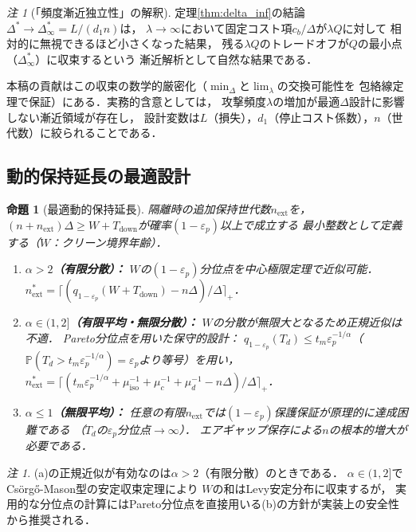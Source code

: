 \documentclass[12pt,a4paper]{article}
\theoremstyle{plain}
\newtheorem{proposition}[theorem]{命題}
\theoremstyle{definition}
\theoremstyle{remark}
\newtheorem{remark}[theorem]{注}
\newcommand{\Prob}{\mathbb{P}}
\newcommand{\Tdown}{T_{\mathrm{down}}}
\newcommand{\Dopt}{\Delta^{*}}
\newcommand{\Dinf}{\Delta^{*}_{\infty}}
\begin{document}
\begin{remark}[「頻度漸近独立性」の解釈]
定理\ref{thm:delta_inf}の結論$\Dopt\to\Dinf=L/(d_1 n)$は，
$\lambda\to\infty$において固定コスト項$c_b/\Delta$が$\lambda Q$に対して
相対的に無視できるほど小さくなった結果，
残る$\lambda Q$のトレードオフが$Q$の最小点（$\Dinf$）に収束するという
漸近解析として自然な結果である．

本稿の貢献はこの収束の数学的厳密化（$\min_\Delta$と$\lim_\lambda$の交換可能性を
包絡線定理で保証）にある．実務的含意としては，
攻撃頻度$\lambda$の増加が最適$\Delta$設計に影響しない漸近領域が存在し，
設計変数は$L$（損失），$d_1$（停止コスト係数），$n$（世代数）に絞られることである．
\end{remark}

\subsection{動的保持延長の最適設計}

\begin{proposition}[最適動的保持延長]\label{prop:next}
隔離時の追加保持世代数$n_{\mathrm{ext}}$を，
$(n+n_{\mathrm{ext}})\Delta\ge W+\Tdown$が確率$(1-\varepsilon_p)$以上で成立する
最小整数として定義する（$W$：クリーン境界年齢）．

\begin{enumerate}[label=(\alph*)]
\item \textbf{$\alpha>2$（有限分散）：}
  $W$の$(1-\varepsilon_p)$分位点を中心極限定理で近似可能．
  $n_{\mathrm{ext}}^*=\lceil(q_{1-\varepsilon_p}(W+\Tdown)-n\Delta)/\Delta\rceil_+$．

\item \textbf{$\alpha\in(1,2]$（有限平均・無限分散）：}
  $W$の分散が無限大となるため正規近似は不適．
  Pareto分位点を用いた保守的設計：
  $q_{1-\varepsilon_p}(T_d)\le t_m\varepsilon_p^{-1/\alpha}$（$\Prob(T_d>t_m\varepsilon_p^{-1/\alpha})=\varepsilon_p$より等号）を用い，
  $n_{\mathrm{ext}}^*=\lceil(t_m\varepsilon_p^{-1/\alpha}+\mu_{\mathrm{iso}}^{-1}+\mu_c^{-1}+\mu_d^{-1}-n\Delta)/\Delta\rceil_+$．

\item \textbf{$\alpha\le1$（無限平均）：}
  任意の有限$n_{\mathrm{ext}}$では$(1-\varepsilon_p)$保護保証が原理的に達成困難である
  （$T_d$の$\varepsilon_p$分位点$\to\infty$）．
  エアギャップ保存による$n$の根本的増大が必要である．
\end{enumerate}
\end{proposition}

\begin{remark}
(a)の正規近似が有効なのは$\alpha>2$（有限分散）のときである．
$\alpha\in(1,2]$でCsörgő-Mason型の安定収束定理により
$W$の和はLevy安定分布に収束するが，
実用的な分位点の計算にはPareto分位点を直接用いる(b)の方針が実装上の安全性から推奨される．
\end{remark}
\end{document}
